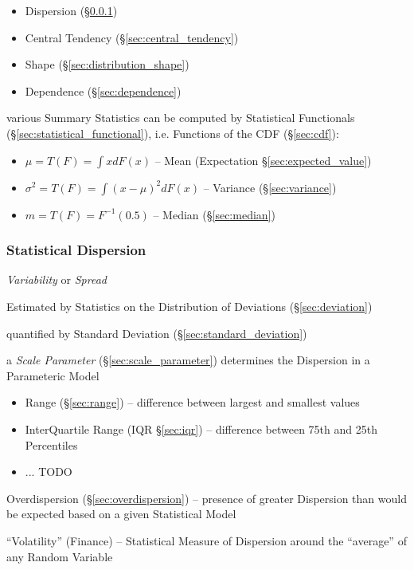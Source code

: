 \begin{itemize}
  \item Dispersion (\S\ref{sec:dispersion})
  \item Central Tendency (\S\ref{sec:central_tendency})
  \item Shape (\S\ref{sec:distribution_shape})
  \item Dependence (\S\ref{sec:dependence})
\end{itemize}

various Summary Statistics can be computed by Statistical Functionals
(\S\ref{sec:statistical_functional}), i.e. Functions of the CDF
(\S\ref{sec:cdf}):
\begin{itemize}
  \item $\mu = T(F) = \int x dF(x)$
    -- Mean (Expectation \S\ref{sec:expected_value})
  \item $\sigma^2 = T(F) = \int (x - \mu)^2 dF(x)$
    -- Variance (\S\ref{sec:variance})
  \item $m = T(F) = F^{-1}(0.5)$
    -- Median (\S\ref{sec:median})
\end{itemize}



\subsubsection{Statistical Dispersion}\label{sec:dispersion}

\emph{Variability} or \emph{Spread}

Estimated by Statistics on the Distribution of Deviations
(\S\ref{sec:deviation})

quantified by Standard Deviation (\S\ref{sec:standard_deviation})

\fist a \emph{Scale Parameter} (\S\ref{sec:scale_parameter}) determines the
Dispersion in a Parameteric Model

\begin{itemize}
  \item Range (\S\ref{sec:range}) -- difference between largest and smallest
    values
  \item InterQuartile Range (IQR \S\ref{sec:iqr}) -- difference between 75th and
    25th Percentiles
  \item ... TODO
\end{itemize}

Overdispersion (\S\ref{sec:overdispersion}) -- presence of greater Dispersion
than would be expected based on a given Statistical Model

``Volatility'' (Finance) -- Statistical Measure of Dispersion around the
``average'' of any Random Variable

